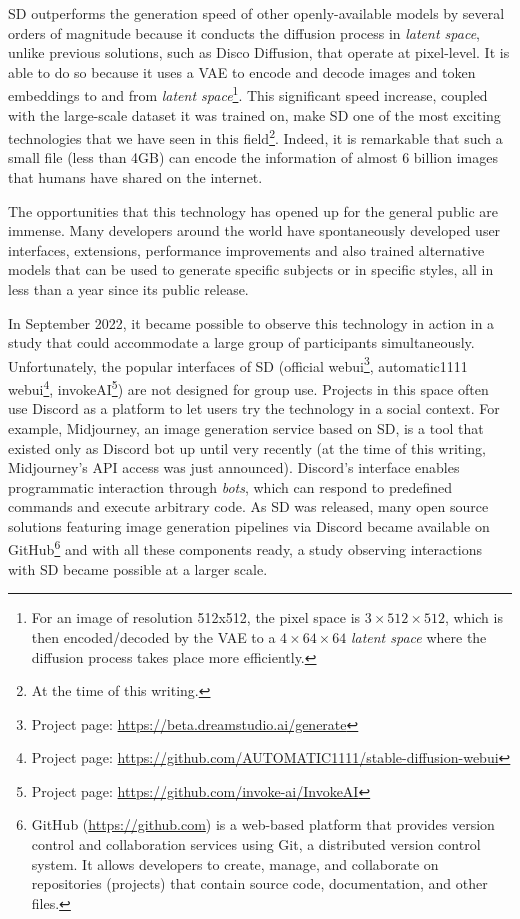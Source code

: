 SD outperforms the generation speed of other openly-available models by several orders of magnitude because it conducts the diffusion process in \emph{latent space}, unlike previous solutions, such as Disco Diffusion, that operate at pixel-level. It is able to do so because it uses a VAE to encode and decode images and token embeddings to and from \emph{latent space}\footnote{For an image of resolution 512x512, the pixel space is $3\times512\times512$, which is then encoded/decoded by the VAE to a $4\times64\times64$ \emph{latent space} where the diffusion process takes place more efficiently.}. This significant speed increase, coupled with the large-scale dataset it was trained on, make SD one of the most exciting technologies that we have seen in this field\footnote{At the time of this writing.}. Indeed, it is remarkable that such a small file (less than 4GB) can encode the information of almost 6 billion images that humans have shared on the internet.

The opportunities that this technology has opened up for the general public are immense. Many developers around the world have spontaneously developed user interfaces, extensions, performance improvements and also trained alternative models that can be used to generate specific subjects or in specific styles, all in less than a year since its public release.

In September 2022, it became possible to observe this technology in action in a study that could accommodate a large group of participants simultaneously. Unfortunately, the popular interfaces of SD (official webui\footnote{Project page: \url{https://beta.dreamstudio.ai/generate}}, automatic1111 webui\footnote{Project page: \url{https://github.com/AUTOMATIC1111/stable-diffusion-webui}}, invokeAI\footnote{Project page: \url{https://github.com/invoke-ai/InvokeAI}}) are not designed for group use. Projects in this space often use Discord as a platform to let users try the technology in a social context. For example, Midjourney, an image generation service based on SD, is a tool that existed only as Discord bot up until very recently (at the time of this writing, Midjourney's API access was just announced). Discord's interface enables programmatic interaction through \emph{bots}, which can respond to predefined commands and execute arbitrary code. As SD was released, many open source solutions featuring image generation pipelines via Discord became available on GitHub\footnote{GitHub (\url{https://github.com}) is a web-based platform that provides version control and collaboration services using Git, a distributed version control system. It allows developers to create, manage, and collaborate on repositories (projects) that contain source code, documentation, and other files.} and with all these components ready, a study observing interactions with SD became possible at a larger scale.

